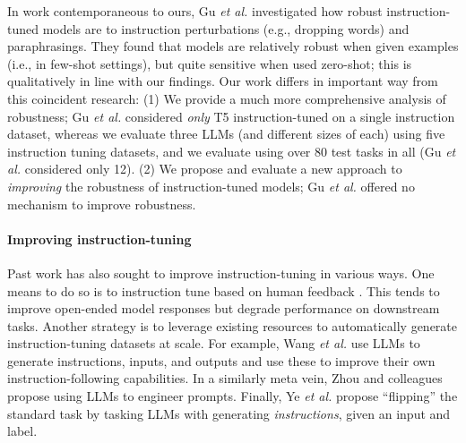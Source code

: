 
In work contemporaneous to ours, Gu \emph{et al.} \cite{gu2023robustness} investigated how robust instruction-tuned models are to instruction perturbations (e.g., dropping words) and paraphrasings. 
They found that models are relatively robust when given examples (i.e., in few-shot settings), but quite sensitive when used zero-shot; this is qualitatively in line with our findings.
Our work differs in important way from this coincident research: (1) We provide a much more comprehensive analysis of robustness; Gu \emph{et al.} considered \emph{only} T5 instruction-tuned on a single instruction dataset, whereas we evaluate three LLMs (and different sizes of each) using five instruction tuning datasets, and we evaluate using over 80 test tasks in all (Gu \emph{et al.} considered only 12). (2) We propose and evaluate a new approach to \emph{improving} the robustness of instruction-tuned models; Gu \emph{et al.} offered no mechanism to improve robustness. 


\paragraph{Improving instruction-tuning}
Past work has also sought to improve instruction-tuning in various ways.
One means to do so is to instruction tune based on human feedback \cite{ouyang2022training, glaese2022improving, bai2022training, nakano2021webgpt, zhang2023wisdom}. 
This tends to improve open-ended model responses but degrade performance on downstream tasks. %
Another strategy is to leverage existing resources to automatically generate instruction-tuning datasets at scale. 
For example, Wang \emph{et al.} \cite{wang2022self} use LLMs to generate instructions, inputs, and outputs and use these to improve their own instruction-following capabilities. 
In a similarly meta vein, Zhou and colleagues \cite{zhou2022large}  propose using LLMs to engineer prompts. 
Finally, Ye \emph{et al.} \cite{ye2022guess} propose ``flipping'' the standard task by tasking LLMs with generating \emph{instructions}, given an input and label. 
